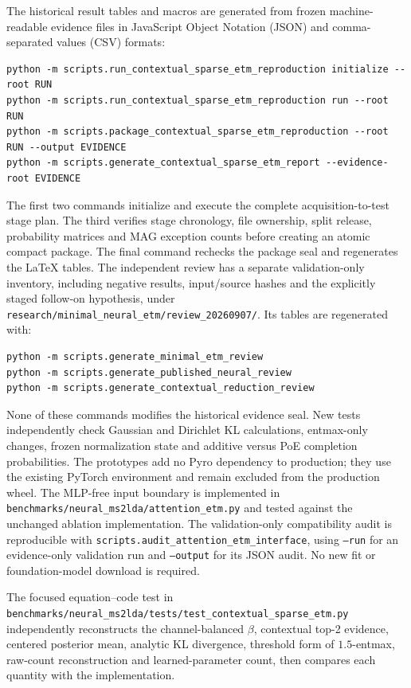 \documentclass[10pt,a4paper]{article}
\begin{document}
The historical result tables and macros are generated from frozen
machine-readable evidence files in JavaScript Object Notation (JSON) and
comma-separated values (CSV) formats:
\begin{verbatim}
python -m scripts.run_contextual_sparse_etm_reproduction initialize --root RUN
python -m scripts.run_contextual_sparse_etm_reproduction run --root RUN
python -m scripts.package_contextual_sparse_etm_reproduction --root RUN --output EVIDENCE
python -m scripts.generate_contextual_sparse_etm_report --evidence-root EVIDENCE
\end{verbatim}
The first two commands initialize and execute the complete acquisition-to-test
stage plan. The third verifies stage chronology, file ownership, split release,
probability matrices and MAG exception counts before creating an atomic compact
package. The final command rechecks the package seal and regenerates the LaTeX
tables.
The independent review has a separate validation-only inventory, including
negative results, input/source hashes and the explicitly staged follow-on
hypothesis, under
\texttt{research/minimal\_neural\_etm/review\_20260907/}.
Its tables are regenerated with:
\begin{verbatim}
python -m scripts.generate_minimal_etm_review
python -m scripts.generate_published_neural_review
python -m scripts.generate_contextual_reduction_review
\end{verbatim}
None of these commands modifies the historical evidence seal. New tests independently
check Gaussian and Dirichlet KL calculations, entmax-only changes, frozen
normalization state and additive versus PoE completion probabilities. The
prototypes add no Pyro dependency to production; they use the existing PyTorch
environment and remain excluded from the production wheel.
The MLP-free input boundary is implemented in
\texttt{benchmarks/neural\_ms2lda/attention\_etm.py} and tested against the
unchanged ablation implementation. The validation-only compatibility audit is
reproducible with \texttt{scripts.audit\_attention\_etm\_interface}, using
\texttt{--run} for an evidence-only validation run and \texttt{--output} for
its JSON audit. No new fit or foundation-model download is required.

The focused equation--code test in
\texttt{benchmarks/neural\_ms2lda/tests/test\_contextual\_sparse\_etm.py} independently
reconstructs the channel-balanced $\beta$, contextual top-2 evidence, centered
posterior mean, analytic KL divergence, threshold form of $1.5$-entmax, raw-count
reconstruction and learned-parameter count, then compares each quantity with
the implementation.
\end{document}
